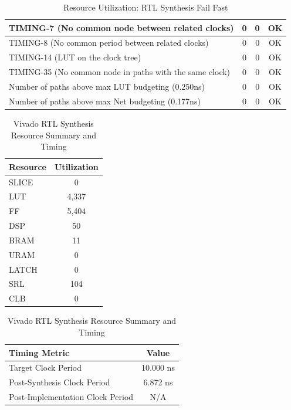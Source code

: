 \documentclass{article}
\begin{document}
\begin{table}[H]
\begin{tabular}{|l|c|c|c|}
    TIMING-7 (No common node between related clocks)                   & 0                  & 0               & OK              \\ \hline
    TIMING-8 (No common period between related clocks)                 & 0                  & 0               & OK              \\ \hline
    TIMING-14 (LUT on the clock tree)                                  & 0                  & 0               & OK              \\ \hline
    TIMING-35 (No common node in paths with the same clock)            & 0                  & 0               & OK              \\ \hline
    Number of paths above max LUT budgeting (0.250ns)                 & 0                  & 0               & OK              \\ \hline
    Number of paths above max Net budgeting (0.177ns)                 & 0                  & 0               & OK              \\ \hline
    \end{tabular}
    \caption{\centering Resource Utilization: RTL Synthesis Fail Fast}
    \label{tab:mlp-failfast-summary}
\end{table}

\begin{table}[H]
    \centering
    \begin{tabular}{|l|c|}
        \hline
        \textbf{Resource} & \textbf{Utilization} \\
        \hline
        SLICE & 0 \\
        LUT & 4,337 \\
        FF & 5,404 \\
        DSP & 50 \\
        BRAM & 11 \\
        URAM & 0 \\
        LATCH & 0 \\
        SRL & 104 \\
        CLB & 0 \\
        \hline
    \end{tabular}

    \vspace{5mm}

    \begin{tabular}{|l|c|}
        \hline
        \textbf{Timing Metric} & \textbf{Value} \\
        \hline
        Target Clock Period & 10.000 ns \\
        Post-Synthesis Clock Period & 6.872 ns \\
        Post-Implementation Clock Period & N/A \\
        \hline
    \end{tabular}

    \caption{Vivado RTL Synthesis Resource Summary and Timing}
\end{table}
\end{document}
